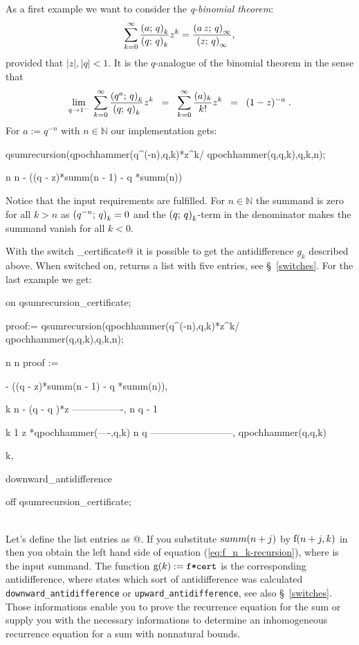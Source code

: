 As a first example we want to consider the {\sl q-binomial theorem}:
\[
	\sum_{k=0}^\infty{\frac{\qfac{a}{k}}{\qfac{q}{k}}z^k} =
	\frac{\qfac{a\,z}{\infty}}{\qfac{z}{\infty}},
\]
provided that $|z|,|q|<1$.
It is the $q$-analogue of the binomial theorem in the sense that
\[
	\lim_{q\rightarrow{}1^-}\;{\sum_{k=0}^\infty{
	\frac{\qfac{q^a}{k}}{\qfac{q}{k}}z^k}} \;\;=\;\; 
	\sum_{k=0}^\infty{\frac{(a)_k}{k!}z^k} \;\;=\;\; (1-z)^{-a}\;.
\]
For $a:=q^{-n}$ with $n\in\mathbb{N}$ our implementation gets:
\begin{redoutput}
\redprompt qsumrecursion(qpochhammer(q^(-n),q,k)*z^k/
   qpochhammer(q,q,k),q,k,n);

      n                     n
 - ((q  - z)*summ(n - 1) - q *summ(n))
\end{redoutput}
%
Notice that the input requirements are fulfilled. For $n\in\mathbb{N}$ the
summand is zero for all $k>n$ as $\qfac{q^{-n}}{k}=0$ and 
the $\qfac{q}{k}$-term in the denominator makes the summand
vanish for all $k<0$.

With the switch \verb@qsumrecursion_certificate@ it is possible
to get the antidifference $g_k$ described above. When switched
on, \verb@qsumrecursion@ returns a list with five entries,
see \S~\ref{switches}. For the
last example we get:

\begin{redoutput}
\redprompt on qsumrecursion_certificate;

\redprompt proof:= qsumrecursion(qpochhammer(q^(-n),q,k)*z^k/
    qpochhammer(q,q,k),q,k,n);

                n                     n
proof := { - ((q  - z)*summ(n - 1) - q *summ(n)),

                k    n
            - (q  - q )*z
          ----------------,
                n
               q  - 1

            k              1
           z *qpochhammer(----,q,k)
                            n
                           q
          --------------------------,
              qpochhammer(q,q,k)

          k,

          downward_antidifference}

\redprompt off qsumrecursion_certificate;
\end{redoutput}
%
\\[-2.5ex]\noindent{}
Let's define the list entries as @. If you
substitute $\fcn{summ}{n+j}$ by $\fcn{f}{n+j,k}$ in \verb@rec@ then
you obtain the left hand side of equation (\ref{eq:f_n_k-recursion}),
where \verb@f@ is the input summand. The function
$\fcn{g}{k}:=\verb@f*cert@$ is the corresponding
antidifference, where \verb@dir@ states which sort of antidifference
was calculated \texttt{downward\_antidifference} or 
\texttt{upward\_antidifference}, see also \S~\ref{switches}.
Those informations enable you to prove the recurrence equation for
the sum or supply you with the necessary informations to determine
an inhomogeneous recurrence equation for a sum with nonnatural bounds.

